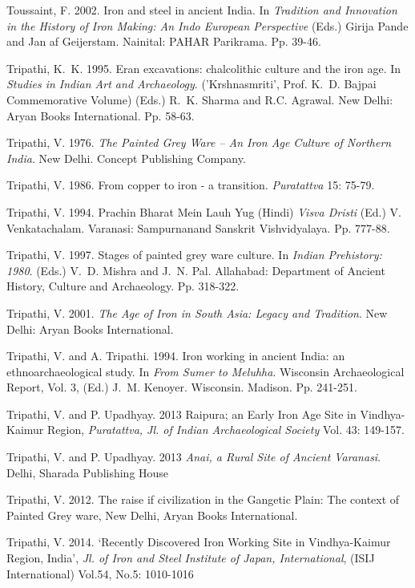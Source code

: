 \begin{thebibliography}{99}
 Toussaint, F. 2002. Iron and steel in ancient India. In \textit{Tradition and Innovation in the History of Iron Making: An Indo European Perspective} (Eds.) Girija Pande and Jan af Geijerstam. Nainital: PAHAR Parikrama. Pp. 39-46. 

 Tripathi, K.~K. 1995. Eran excavations: chalcolithic culture and the iron age. In \textit{Studies in Indian Art and Archaeology}. ('Krshnasmriti', Prof. K.~D. Bajpai Commemorative Volume) (Eds.) R.~K. Sharma and R.C. Agrawal. New Delhi: Aryan Books International. Pp. 58-63. 

 Tripathi, V. 1976. \textit{The Painted Grey Ware – An Iron Age Culture of Northern India}. New Delhi. Concept Publishing Company. 

 Tripathi, V. 1986. From copper to iron - a transition. \textit{Puratattva} 15: 75-79. 

 Tripathi, V. 1994. Prachin Bharat Mein Lauh Yug (Hindi) \textit{Visva Dristi} (Ed.) V. Venkatachalam. Varanasi: Sampurnanand Sanskrit Vishvidyalaya. Pp. 777-88.

 Tripathi, V. 1997. Stages of painted grey ware culture. In \textit{Indian Prehistory: 1980}. (Eds.) V.~D. Mishra and J.~N. Pal. Allahabad: Department of Ancient History, Culture and Archaeology. Pp. 318-322.

 Tripathi, V. 2001. \textit{The Age of Iron in South Asia: Legacy and Tradition}. New Delhi: Aryan Books International. 

 Tripathi, V. and A. Tripathi. 1994. Iron working in ancient India: an ethnoarchaeological study. In \textit{From Sumer to Meluhha}. Wisconsin Archaeological Report, Vol. 3, (Ed.) J.~M. Kenoyer. Wisconsin. Madison. Pp. 241-251.

 Tripathi, V. and P. Upadhyay. 2013 Raipura; an Early Iron Age Site in Vindhya-Kaimur Region, \textit{Puratattva, Jl. of Indian Archaeological Society} Vol. 43: 149-157.

 Tripathi, V. and P. Upadhyay. 2013 \textit{Anai, a Rural Site of Ancient Varanasi}. Delhi, Sharada Publishing House
 
 Tripathi, V. 2012. The raise if civilization in the Gangetic Plain: The context of Painted Grey ware, New Delhi, Aryan Books International.

 Tripathi, V. 2014. ‘Recently Discovered Iron Working Site in Vindhya-Kaimur Region, India’, \textit{Jl. of Iron and Steel Institute of Japan, International}, (ISIJ International) Vol.54, No.5: 1010-1016


\end{thebibliography}
